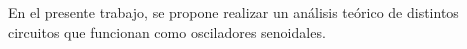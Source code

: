 En el presente trabajo, se propone realizar un análisis teórico de distintos circuitos que funcionan como osciladores senoidales.